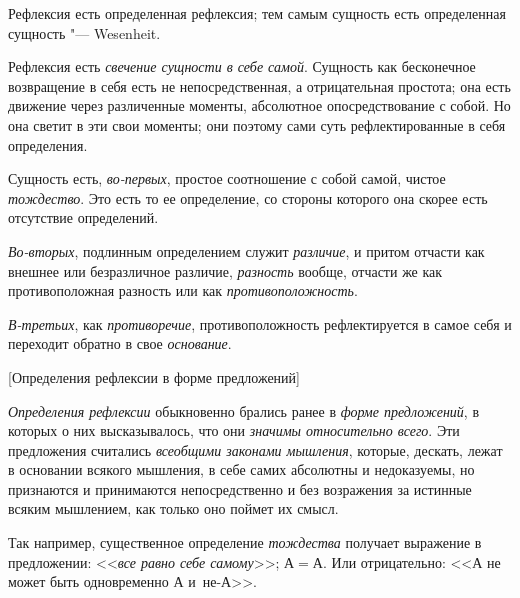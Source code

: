 
Рефлексия есть определенная рефлексия; тем самым
сущность есть определенная сущность "--- Wesenheit.

Рефлексия есть {\em свечение сущности в себе самой}.
Сущность как бесконечное возвращение в себя есть не непосредственная, а
отрицательная простота; она есть движение через различенные моменты,
абсолютное опосредствование с собой. Но она светит в эти свои моменты; они
поэтому сами суть рефлектированные в себя определения.

Сущность есть, {\em во-первых}, простое соотношение с
собой самой, чистое {\em тождество}. Это есть то ее
определение, со стороны которого она скорее есть отсутствие определений.

{\em Во-вторых}, подлинным определением служит {\em различие}, и притом
отчасти как внешнее или безразличное различие, {\em разность} вообще,
отчасти же как противоположная разность или как {\em противоположность}.

{\em В-третьих}, как {\em противоречие}, противоположность рефлектируется в
самое себя и переходит обратно в свое {\em основание}.

%
  {[Определения рефлексии в форме предложений]}

{\em Определения рефлексии} обыкновенно брались ранее в
{\em форме предложений}, в которых о них высказывалось,
что они {\em значимы относительно всего}. Эти
предложения считались {\em всеобщими законами
мышления}, которые, дескать, лежат в основании всякого мышления, в себе
самих абсолютны и недоказуемы, но признаются и принимаются непосредственно
и без возражения за истинные всяким мышлением, как только оно поймет их смысл.

Так например, существенное определение {\em тождества}
получает выражение в предложении: <<{\em все равно себе
самому}>>; $А=А$. Или отрицательно: <<$А$ не может
быть одновременно $А$ и~не-$А$>>.


